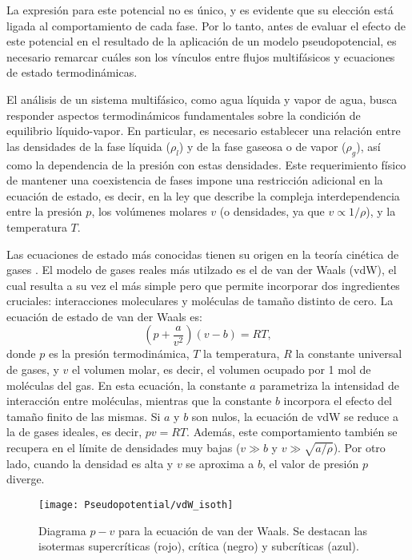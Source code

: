 La expresi\'on para este potencial no es \'unico, y es evidente que su elecci\'on est\'a ligada al comportamiento de cada fase. Por lo tanto, antes de evaluar el efecto de este potencial en el resultado de la aplicaci\'on de un modelo pseudopotencial, es necesario remarcar cu\'ales son los v\'inculos entre flujos multif\'asicos y ecuaciones de estado termodin\'amicas.

El an\'alisis de un sistema multif\'asico, como agua l\'iquida y vapor de agua, busca responder aspectos termodin\'amicos fundamentales sobre la condici\'on de equilibrio l\'iquido-vapor. En particular, es necesario establecer una relaci\'on entre las densidades de la fase l\'iquida ($\rho_l$) y de la fase gaseosa o de vapor ($\rho_g$), as\'i como la dependencia de la presi\'on con estas densidades. Este requerimiento f\'isico de mantener una coexistencia de fases impone una restricci\'on adicional en la ecuaci\'on de estado, es decir, en la ley que describe la compleja interdependencia entre la presi\'on $p$, los vol\'umenes molares $v$ (o densidades, ya que $v \propto 1/\rho$), y la temperatura $T$. 

Las ecuaciones de estado m\'as conocidas tienen su origen en la teor\'ia cin\'etica de gases \cite{blundell_concepts_2006}. El modelo de gases reales m\'as utilzado es el de van der Waals (vdW), el cual resulta a su vez el m\'as simple pero que permite incorporar dos ingredientes cruciales: interacciones moleculares y mol\'eculas de tama\~no distinto de cero. La ecuaci\'on de estado de van der Waals es:
\begin{equation}
	\left( p + \dfrac{a}{v^2} \right) \left( v-b \right) = RT,
\end{equation}
donde $p$ es la presi\'on termodin\'amica, $T$ la temperatura, $R$ la constante universal de gases, y $v$ el volumen molar, es decir, el volumen ocupado por 1 mol de mol\'eculas del gas. En esta ecuaci\'on, la constante $a$ parametriza la intensidad de interacci\'on entre mol\'eculas, mientras que la constante $b$ incorpora el efecto del tama\~no finito de las mismas. Si $a$ y $b$ son nulos, la ecuaci\'on de vdW se reduce a la de gases ideales, es decir, $pv = RT$. Adem\'as, este comportamiento tambi\'en se recupera en el l\'imite de densidades muy bajas ($v \gg b$ y $v \gg \sqrt{a/\rho}$). Por otro lado, cuando la densidad es alta y $v$ se aproxima a $b$, el valor de presi\'on $p$ diverge.

\begin{figure}[ht]
	\centering
	\texttt{[image: Pseudopotential/vdW\_isoth]}
	\caption{Diagrama $p-v$ para la ecuaci\'on de van der Waals. Se destacan las isotermas supercr\'iticas (rojo), cr\'itica (negro) y subcr\'iticas (azul).}
	\label{fig:vdW_isoth}
\end{figure}

